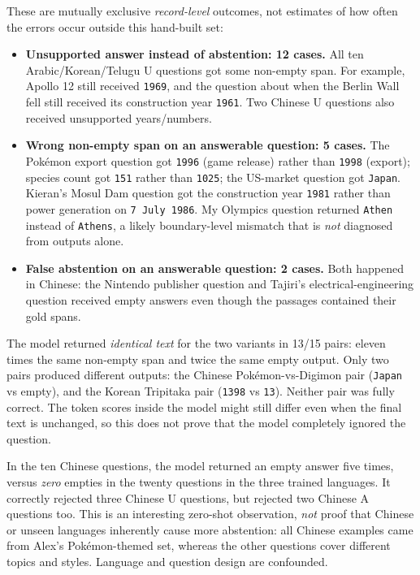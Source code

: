 \documentclass[10pt,a4paper]{article}
\newcommand{\sectionline}[1]{\vspace{5pt}{\large\bfseries #1}\par\vspace{1pt}}
\begin{document}
\sectionline{4. Recurring failure types}

These are mutually exclusive \emph{record-level} outcomes, not estimates of how often the errors occur outside this hand-built set:

\begin{itemize}

\item \textbf{Unsupported answer instead of abstention: 12 cases.}
All ten Arabic/Korean/Telugu U questions got some non-empty span. For example, Apollo 12 still received \texttt{1969}, and the question about when the Berlin Wall fell still received its construction year \texttt{1961}. Two Chinese U questions also received unsupported years/numbers.

\item \textbf{Wrong non-empty span on an answerable question: 5 cases.}
The Pok\'emon export question got \texttt{1996} (game release) rather than \texttt{1998} (export); species count got \texttt{151} rather than \texttt{1025}; the US-market question got \texttt{Japan}. Kieran's Mosul Dam question got the construction year \texttt{1981} rather than power generation on \texttt{7 July 1986}. My Olympics question returned \texttt{Athen} instead of \texttt{Athens}, a likely boundary-level mismatch that is \emph{not} diagnosed from outputs alone.

\item \textbf{False abstention on an answerable question: 2 cases.}
Both happened in Chinese: the Nintendo publisher question and Tajiri's electrical-engineering question received empty answers even though the passages contained their gold spans.

\end{itemize}

\newpage

\sectionline{5. What the paired test tells us}

The model returned \emph{identical text} for the two variants in 13/15 pairs: eleven times the same non-empty span and twice the same empty output. Only two pairs produced different outputs: the Chinese Pok\'emon-vs-Digimon pair (\texttt{Japan} vs empty), and the Korean Tripitaka pair (\texttt{1398} vs \texttt{13}). Neither pair was fully correct. The token scores inside the model might still differ even when the final text is unchanged, so this does not prove that the model completely ignored the question.

In the ten Chinese questions, the model returned an empty answer five times, versus \emph{zero} empties in the twenty questions in the three trained languages. It correctly rejected three Chinese U questions, but rejected two Chinese A questions too. This is an interesting zero-shot observation, \emph{not} proof that Chinese or unseen languages inherently cause more abstention: all Chinese examples came from Alex's Pok\'emon-themed set, whereas the other questions cover different topics and styles. Language and question design are confounded.
\end{document}
